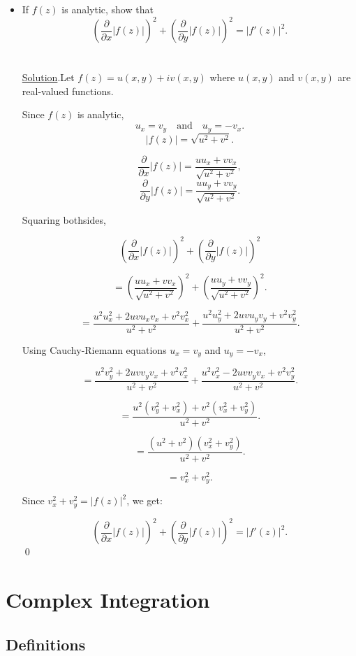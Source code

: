 \documentclass{article}
\begin{document}
\newpage
\begin{itemize}
    \item If \( f(z) \) is analytic, show that
\[
\left( \frac{\partial}{\partial x} |f(z)| \right)^2 + \left( \frac{\partial}{\partial y} |f(z)| \right)^2 = |f'(z)|^2.
\]
    \\
    \\
    \underline{Solution}.Let \( f(z) = u(x,y) + i v(x,y) \) where \( u(x,y) \) and \( v(x,y) \) are real-valued functions.

Since \( f(z) \) is analytic,
\[
u_x = v_y \quad \text{and} \quad u_y = -v_x.
\]
\[
|f(z)| = \sqrt{u^2 + v^2}.
\]


\[
\frac{\partial}{\partial x} |f(z)| = \frac{u u_x + v v_x}{\sqrt{u^2 + v^2}},
\]
\[
\frac{\partial}{\partial y} |f(z)| = \frac{u u_y + v v_y}{\sqrt{u^2 + v^2}}.
\]

Squaring bothsides,

\[
\left( \frac{\partial}{\partial x} |f(z)| \right)^2 + \left( \frac{\partial}{\partial y} |f(z)| \right)^2
\]

\[
= \left( \frac{u u_x + v v_x}{\sqrt{u^2 + v^2}} \right)^2 + \left( \frac{u u_y + v v_y}{\sqrt{u^2 + v^2}} \right)^2.
\]


\[
= \frac{u^2 u_x^2 + 2 u v u_x v_x + v^2 v_x^2}{u^2 + v^2} + \frac{u^2 u_y^2 + 2 u v u_y v_y + v^2 v_y^2}{u^2 + v^2}.
\]

Using Cauchy-Riemann equations \( u_x = v_y \) and \( u_y = -v_x \),

\[
= \frac{u^2 v_y^2 + 2 u v v_y v_x + v^2 v_x^2}{u^2 + v^2} + \frac{u^2 v_x^2 - 2 u v v_y v_x + v^2 v_y^2}{u^2 + v^2}.
\]

\[
= \frac{u^2 (v_y^2 + v_x^2) + v^2 (v_x^2 + v_y^2)}{u^2 + v^2}.
\]

\[
= \frac{(u^2 + v^2) (v_x^2 + v_y^2)}{u^2 + v^2}.
\]

\[
= v_x^2 + v_y^2.
\]

Since \( v_x^2 + v_y^2 = |f(z)|^2 \), we get:

\[
\left( \frac{\partial}{\partial x} |f(z)| \right)^2 + \left( \frac{\partial}{\partial y} |f(z)| \right)^2 = |f'(z)|^2.
\]\qed

\end{itemize}
\section{Complex Integration}
\subsection{Definitions}
\end{document}
